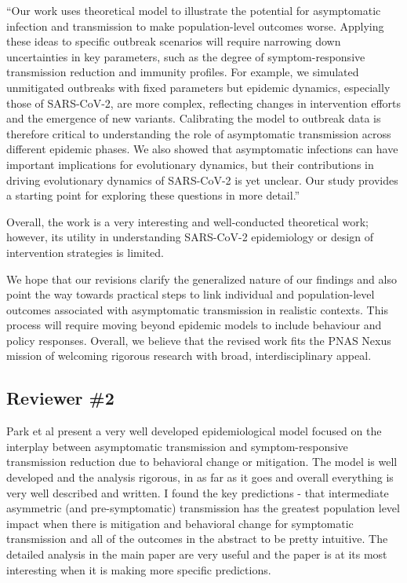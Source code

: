 \documentclass[12pt]{article}
\newcommand{\rev}{\subsection*}
\newcommand{\revtext}{\textsf}
\begin{document}
``Our work uses theoretical model to illustrate the potential for asymptomatic infection and transmission to make population-level outcomes worse.
Applying these ideas to specific outbreak scenarios will require narrowing down uncertainties in key parameters, such as the degree of symptom-responsive transmission reduction and immunity profiles.
For example, we simulated unmitigated outbreaks with fixed parameters but epidemic dynamics, especially those of SARS-CoV-2, are more complex, reflecting changes in intervention efforts and the emergence of new variants.
Calibrating the model to outbreak data is therefore critical to understanding the role of asymptomatic transmission across different epidemic phases.
We also showed that asymptomatic infections can have important implications for evolutionary dynamics, but their contributions in driving evolutionary dynamics of SARS-CoV-2 is yet unclear.
Our study provides a starting point for exploring these questions in more detail.''

\revtext{Overall, the work is a very interesting and well-conducted theoretical work; however, its utility in understanding SARS-CoV-2 epidemiology or design of intervention strategies is limited.}

We hope that our revisions clarify the generalized nature of our findings and also point the way towards practical steps to link individual and population-level outcomes associated with asymptomatic transmission in realistic contexts. 
This process will require moving beyond epidemic models to include behaviour and policy responses.  
Overall, we believe that the revised work fits the PNAS Nexus mission of welcoming rigorous research with broad, interdisciplinary appeal.

\rev{Reviewer \#2}

\revtext{Park et al present a very well developed epidemiological model focused on the interplay between asymptomatic transmission and symptom-responsive transmission reduction due to behavioral change or mitigation. The model is well developed and the analysis rigorous, in as far as it goes and overall everything is very well described and written. I found the key predictions - that intermediate asymmetric (and pre-symptomatic) transmission has the greatest population level impact when there is mitigation and behavioral change for symptomatic transmission and all of the outcomes in the abstract to be pretty intuitive. The detailed analysis in the main paper are very useful and the paper is at its most interesting when it is making more specific predictions.}
\end{document}
